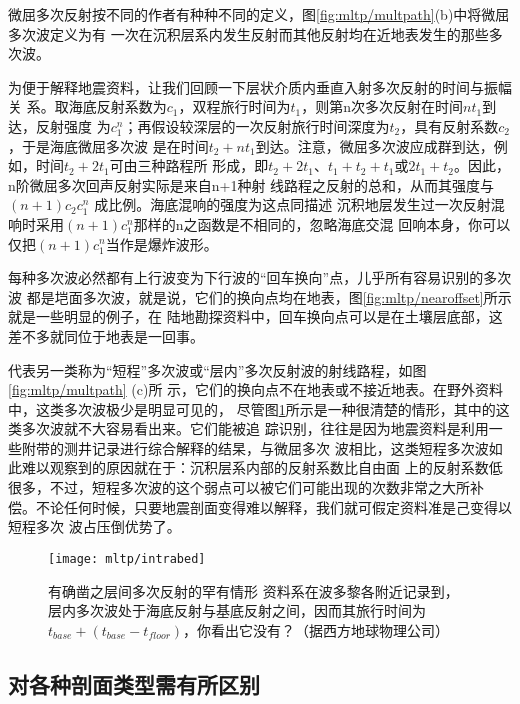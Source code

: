 微屈多次反射按不同的作者有种种不同的定义，图\ref{fig:mltp/multpath}(b)中将微屈多次波定义为有
一次在沉积层系内发生反射而其他反射均在近地表发生的那些多次波。

为便于解释地震资料，让我们回顾一下层状介质内垂直入射多次反射的时间与振幅关
系。取海底反射系数为$c_1$，双程旅行时间为$t_1$，则第n次多次反射在时间$nt_1$到达，反射强度
为$c_1^n$；再假设较深层的一次反射旅行时间深度为$t_2$，具有反射系数$c_2$，于是海底微屈多次波
是在时间$t_2+nt_1$到达。注意，微屈多次波应成群到达，例如，时间$t_2+2t_1$可由三种路程所
形成，即$t_2+2t_1$、$t_1+t_2+t_1$或$2t_1+t_2$。因此，n阶微屈多次回声反射实际是来自n+1种射
线路程之反射的总和，从而其强度与$(n+1)c_2c_1^n$
成比例。海底混响的强度为这点同描述
沉积地层发生过一次反射混响时采用$(n+1)c_1^n$那样的n之函数是不相同的，忽略海底交混
回响本身，你可以仅把$(n+1)c_1^n$当作是爆炸波形。

每种多次波必然都有上行波变为下行波的“回车换向”点，儿乎所有容易识别的多次波
都是垲面多次波，就是说，它们的换向点均在地表，图\ref{fig:mltp/nearoffset}所示就是一些明显的例子，在
陆地勘探资料中，回车换向点可以是在土壤层底部，这差不多就同位于地表是一回事。

代表另一类称为“短程”多次波或“层内”多次反射波的射线路程，如图\ref{fig:mltp/multpath}
(c)所
示，它们的换向点不在地表或不接近地表。在野外资料中，这类多次波极少是明显可见的，
尽管图\ref{fig:mltp/intrabed}所示是一种很清楚的情形，其中的这类多次波就不大容易看出来。它们能被追
踪识别，往往是因为地震资料是利用一些附带的测井记录进行综合解释的结杲，与微屈多次
波相比，这类短程多次波如此难以观察到的原因就在于：沉积层系内部的反射系数比自由面
上的反射系数低很多，不过，短程多次波的这个弱点可以被它们可能出现的次数非常之大所补
偿。不论任何时候，只要地震剖面变得难以解释，我们就可假定资料准是己变得以短程多次
波占压倒优势了。

\begin{figure}[H]
\centering
\texttt{[image: mltp/intrabed]}
\caption[intrabed]{
有确凿之层间多次反射的罕有情形
资料系在波多黎各附近记录到，层内多次波处于海底反射与基底反射之间，因而其旅行时间为
$t_{base}+(t_{base}-t_{floor})$，你看出它没有？（据西方地球物理公司）
}
\label{fig:mltp/intrabed}
\end{figure}

\subsection{对各种剖面类型需有所区别}
\label{sec:5.5.6}






